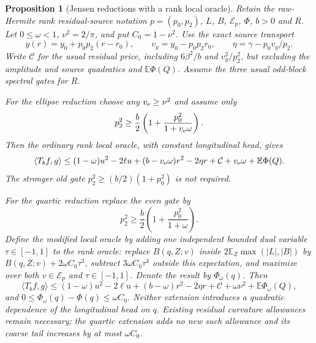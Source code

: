 \documentclass[11pt]{article}
\newtheorem{proposition}[theorem]{Proposition}
\begin{document}
\begin{proposition}[Jensen reductions with a rank local oracle]
\label{prop:jensen-rank-reductions}
Retain the raw-Hermite rank residual-source notation
$p=(p_0,p_2)$, $L$, $B$, $\mathcal E_p$, $\Phi$, $b>0$ and $R$.
Let $0\le\omega<1$, $\nu^2=2/\pi$, and put $C_0=1-\nu^2$.
Use the exact source transport
\[
 y(r)=y_0+p_0p_2(r-r_0),\qquad v_y=y_0-p_0p_2r_0,
 \qquad \eta=\gamma-p_0v_y/p_2.
\]
Write $\mathcal C$ for the usual residual price, including
$6\beta^2/b$ and $v_y^2/p_2^2$, but excluding the amplitude and
source quadratics and $\mathbb E\Phi(Q)$.
Assume the three usual odd-block spectral gates for $R$.

For the ellipse reduction choose any $v_{\rm e}\ge\nu^2$ and assume only
\begin{equation}\label{eq:jensen-ellipse-even-gate}
 p_2^2\ge\frac b2\left(1+\frac{p_0^2}{1+v_{\rm e}\omega}\right).
\end{equation}
Then the ordinary rank local oracle, with constant longitudinal head,
gives
\begin{equation}\label{eq:jensen-ellipse-rank-price}
 \langle T_bf,g\rangle\le
 (1-\omega)u^2-2\ell u+(b-v_{\rm e}\omega)r^2-2\eta r
 +\mathcal C+v_{\rm e}\omega+\mathbb E\Phi(Q).
\end{equation}
The stronger old gate $p_2^2\ge(b/2)(1+p_0^2)$ is not required.

For the quartic reduction replace the even gate by
\begin{equation}\label{eq:jensen-quartic-even-gate}
 p_2^2\ge\frac b2\left(1+\frac{p_0^2}{1+\omega}\right).
\end{equation}
Define the modified local oracle by adding one independent bounded
dual variable $\tau\in[-1,1]$ to the rank oracle: replace $B(q,Z;v)$
inside $2\mathbb E_Z\max(|L|,|B|)$ by
$B(q,Z;v)+2\omega C_0\tau^3$, subtract $3\omega C_0\tau^4$
outside this expectation, and maximize over both $v\in\mathcal E_p$
and $\tau\in[-1,1]$. Denote the result by $\Phi_\omega(q)$.
Then
\begin{equation}\label{eq:jensen-quartic-rank-price}
 \langle T_bf,g\rangle\le
 (1-\omega)u^2-2\ell u+(b-\omega)r^2-2\eta r
 +\mathcal C+\omega\nu^2+\mathbb E\Phi_\omega(Q),
\end{equation}
and $0\le\Phi_\omega(q)-\Phi(q)\le\omega C_0$.
Neither extension introduces a quadratic dependence of the longitudinal
head on $q$. Existing residual curvature allowances remain necessary;
the quartic extension adds no new such allowance and its coarse tail
increases by at most $\omega C_0$.
\end{proposition}
\end{document}
